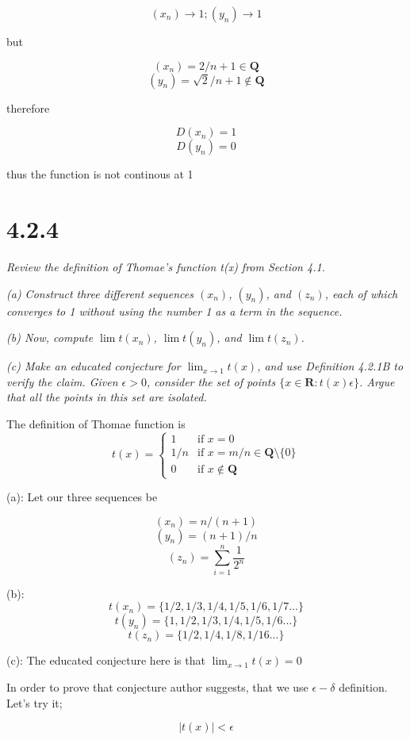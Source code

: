 \documentclass[11pt,oneside,titlepage]{article}
\begin{document}
$$(x_n) \to 1;(y_n) \to 1$$

but

$$(x_n) = 2/n + 1 \in \textbf{Q}$$
$$(y_n) = \sqrt{2}/n + 1 \notin \textbf{Q}$$

therefore

$$ D(x_n) = 1$$
$$ D(y_n) = 0$$

thus the function is not continous at 1

\section*{4.2.4}
\textit{Review the definition of Thomae’s function t(x) from Section 4.1.}

\textit{(a) Construct three different sequences $(x_n)$, $(y_n)$, and $(z_n)$, each of which converges to 1 without using the number 1 as a term in the sequence.}

\textit{(b) Now, compute $\lim t(x_n)$, $\lim t(y_n)$, and $\lim t(z_n)$.}

\textit{(c) Make an educated conjecture for $\lim_{x\to1} t(x)$, and use Definition 4.2.1B
  to verify the claim. Given $\epsilon > 0$, consider the set of points
$\{x \in \textbf{R} : t(x)  \epsilon\}$.  Argue that all the points in this set are isolated.}


The definition of  Thomae function is
\begin{equation}
t(x)=
    \begin{cases}
      1 & \text{if } x = 0\\
      1/n & \text {if } x = m/n \in \textbf{Q} \text{\textbackslash} \{0\} \\
      0 & \text{if } x \notin \textbf{Q}
    \end{cases}
\end{equation}

(a): Let our three sequences be

$$ (x_n) = n/(n + 1)$$
$$ (y_n) = (n + 1)/n$$
$$ (z_n) = \sum_{i=1}^{n}{\frac{1}{2^n}}$$

(b):
$$t(x_n) = \{1/2, 1/3, 1/4, 1/5, 1/6, 1/7 ...\}$$
$$t(y_n) = \{1, 1/2, 1/3, 1/4, 1/5, 1/6 ...\}$$
$$t(z_n) = \{1/2, 1/4, 1/8, 1/16 ...\}$$

(c): The educated conjecture here is that $\lim_{x \to 1} t(x) = 0$

In order to prove that conjecture author suggests, that we use $\epsilon-\delta$ definition. Let's try
it;

$$ |t(x)| < \epsilon$$
\end{document}
